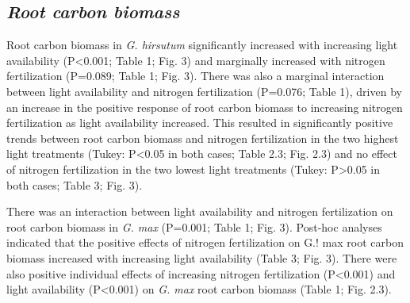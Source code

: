 \subsection{\textit{Root carbon biomass}}
Root carbon biomass in \textit{G. hirsutum} significantly increased with increasing light availability (P<0.001; Table 1; Fig. 3) and marginally increased with nitrogen fertilization (P=0.089; Table 1; Fig. 3). There was also a marginal interaction between light availability and nitrogen fertilization (P=0.076; Table 1), driven by an increase in the positive response of root carbon biomass to increasing nitrogen fertilization as light availability increased. This resulted in significantly positive trends between root carbon biomass and nitrogen fertilization in the two highest light treatments (Tukey: P<0.05 in both cases; Table 2.3; Fig. 2.3) and no effect of nitrogen fertilization in the two lowest light treatments (Tukey: P>0.05 in both cases; Table 3; Fig. 3). 

There was an interaction between light availability and nitrogen fertilization on root carbon biomass in \textit{G. max} (P=0.001; Table 1; Fig. 3). Post-hoc analyses indicated that the positive effects of nitrogen fertilization on G.! max root carbon biomass increased with increasing light availability (Table 3; Fig. 3). There were also positive individual effects of increasing nitrogen fertilization (P<0.001) and light availability (P<0.001) on \textit{G. max} root carbon biomass (Table 1; Fig. 2.3).

